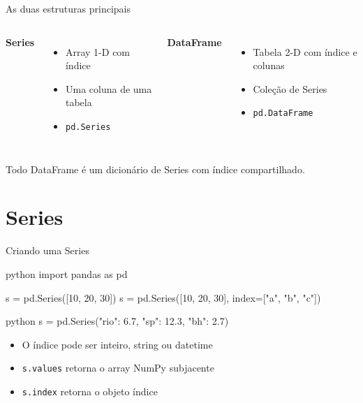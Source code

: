 \documentclass[xcolor=dvipsnames,t,aspectratio=169]{beamer}
\newcommand{\highlight}[1]{{\color{nes_dark_orange} #1}}
\begin{document}
\begin{frame}[c]{As duas estruturas principais}

\begin{columns}
\textbf{\color{nes_dark_purple}Series}
\begin{itemize}
    \item Array 1-D com \highlight{índice}
    \item Uma coluna de uma tabela
    \item \texttt{pd.Series}
\end{itemize}

\textbf{\color{nes_dark_purple}DataFrame}
\begin{itemize}
    \item Tabela 2-D com \highlight{índice} e \highlight{colunas}
    \item Coleção de Series
    \item \texttt{pd.DataFrame}
\end{itemize}
\end{columns}

\vspace{1em}


\begin{display}[Importante]
Todo DataFrame é um dicionário de Series com índice compartilhado.
\end{display}

\end{frame}


\section{Series}

\begin{frame}[c, fragile]{Criando uma Series}

\begin{code}{python}
import pandas as pd

s = pd.Series([10, 20, 30])
s = pd.Series([10, 20, 30], index=["a", "b", "c"])
\end{code}

\begin{code}{python}
s = pd.Series({"rio": 6.7, "sp": 12.3, "bh": 2.7})
\end{code}

\begin{itemize}
    \item O índice pode ser \highlight{inteiro, string ou datetime}
    \item \texttt{s.values} retorna o array NumPy subjacente
    \item \texttt{s.index} retorna o objeto índice
\end{itemize}

\end{frame}
\end{document}
